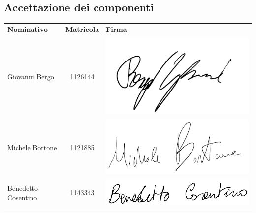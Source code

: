 \subsection{Accettazione dei componenti}
{\renewcommand{\arraystretch}{1.4}%
\begin{table}[H]
	\centering
\begin{tabular}{| l | c | >{\centering\arraybackslash}m{8cm}
		|} 
	\rowcolor{LightBlue}

	\textbf{\color{white}Nominativo} & 
	\textbf{\color{white}Matricola} & 
	\textbf{\color{white}Firma} \\

	Giovanni Bergo & 1126144 & \includegraphics[scale=0.5]{images/firme/giova.pdf}\\
	Michele Bortone & 1121885 & \includegraphics[scale=0.6]{images/firme/michele.pdf}\\[0.8cm]
	Benedetto Cosentino & 1143343 & \includegraphics[scale=0.5]{images/firme/benedetto.pdf}\\	

\end{tabular}
\end{table}}
